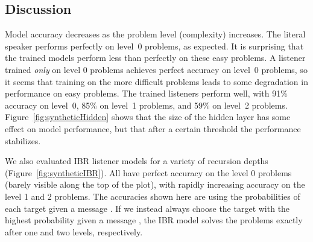 \subsection{Discussion}

Model accuracy decreases as the problem level (complexity) increases.
The literal speaker performs perfectly on level~0 problems, as
expected. It is surprising that the trained models perform less than
perfectly on these easy problems. A listener trained \emph{only} on
level 0 problems achieves perfect accuracy on level~0 problems, so it
seems that training on the more difficult problems leads to some
degradation in performance on easy problems. The trained listeners
perform well, with 91\% accuracy on level~0, 85\% on level~1 problems,
and 59\% on level~2 problems.
Figure~\ref{fig:syntheticHidden} shows that the size of the hidden layer 
has some effect on model performance, but that after a certain threshold 
the performance stabilizes.

We also evaluated IBR listener models for a variety of recursion 
depths (Figure~\ref{fig:syntheticIBR}). All have perfect accuracy on
the level 0 problems (barely visible along the top of the plot), with
rapidly increasing accuracy on the level 1 and 2 problems. The
accuracies shown here are using the probabilities of each target given
a message \citep{Frank:Goodman:2012,Bergen:Goodman:Levy:2012}. If we
instead always choose the target with the highest probability given a
message \citep{Franke09DISS,Jaeger:2007,Jaeger:2011}, the IBR model
solves the problems exactly after one and two levels, respectively.


